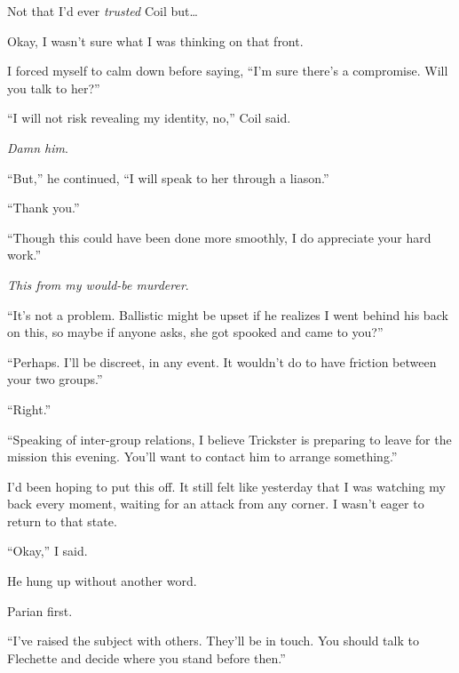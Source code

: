 Not that I'd ever \emph{trusted }Coil but\ldots



Okay, I wasn't sure what I was thinking on that front.



I forced myself to calm down before saying, ``I'm sure there's a compromise.  Will you talk to her?''



``I will not risk revealing my identity, no,'' Coil said.



\emph{Damn him}.



``But,'' he continued, ``I will speak to her through a liason.''



``Thank you.''



``Though this could have been done more smoothly, I do appreciate your hard work.''



\emph{This from my would-be murderer}.



``It's not a problem.  Ballistic might be upset if he realizes I went behind his back on this, so maybe if anyone asks, she got spooked and came to you?''



``Perhaps.  I'll be discreet, in any event.  It wouldn't do to have friction between your two groups.''



``Right.''



``Speaking of inter-group relations, I believe Trickster is preparing to leave for the mission this evening.  You'll want to contact him to arrange something.''



I'd been hoping to put this off.  It still felt like yesterday that I was watching my back every moment, waiting for an attack from any corner.  I wasn't eager to return to that state.



``Okay,'' I said.



He hung up without another word.



Parian first.



``I've raised the subject with others.  They'll be in touch.  You should talk to Flechette and decide where you stand before then.''



